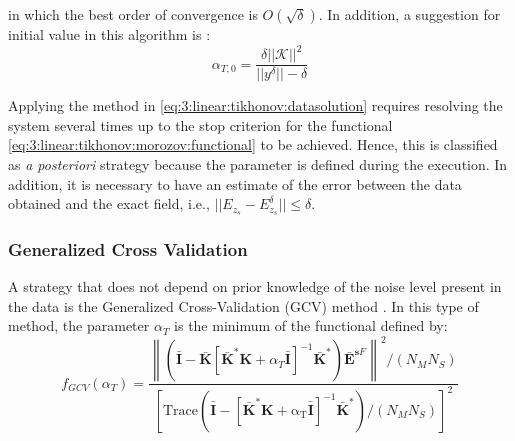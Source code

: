 				\noindent in which the best order of convergence is $O(\sqrt{\delta})$. In addition, a suggestion for initial value in this algorithm is \citep{kirsch2011introduction}:
				\begin{equation}
					\alpha_{T,0} = \frac{\delta||\mathcal{K}||^2}{||y^\delta||-\delta} \label{eq:3:linear:tikhonov:morozov:initialguess}
				\end{equation}
				
				Applying the method in \eqref{eq:3:linear:tikhonov:datasolution} requires resolving the system several times up to the stop criterion for the functional \eqref{eq:3:linear:tikhonov:morozov:functional} to be achieved. Hence, this is classified as \textit{a posteriori} strategy because the parameter is defined during the execution. In addition, it is necessary to have an estimate of the error between the data obtained and the exact field, i.e., $||E_{z_s}-E_{z_s}^\delta|| \le \delta$.

			\subsubsection{Generalized Cross Validation}\label{chap:methods:linear:tikhonov:gcv}
				
				A strategy that does not depend on prior knowledge of the noise level present in the data is the Generalized Cross-Validation (GCV) method \citep{chen2017}. In this type of method, the parameter $\alpha_T$ is the minimum of the functional defined by:
				\begin{equation}
					f_{GCV}(\alpha_T) = \frac{\left\|\left(\mathbf{\bar{I}}-\mathbf{\bar{K}}\left[\mathbf{\bar{K}}^*\mathbf{K}+\alpha_T\mathbf{\bar{I}}\right]^{-1}\mathbf{\bar{K}}^*\right)\mathbf{\bar{E}}^{\mathbf{s}F}\right\|^2/(N_MN_S)}{\left[\mathrm{Trace\left(\mathbf{\bar{I}}-\left[\mathbf{\bar{K}}^*\mathbf{K}+\alpha_T\mathbf{\bar{I}}\right]^{-1}\mathbf{\bar{K}}^*\right)}/(N_MN_S)\right]^2} \label{eq:3:linear:tikhonov:gcv}
				\end{equation}
			

